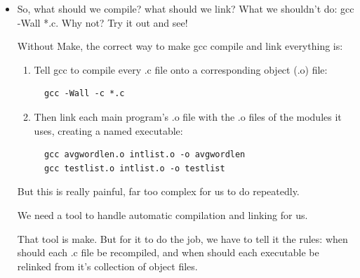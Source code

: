 \documentclass[handout]{beamer}
\begin{document}
\begin{frame}[fragile]
    \begin{itemize}
    \item
    So, what should we compile?  what should we link?
    \pitem
    What we shouldn't do: \alert{gcc -Wall *.c}.  Why not?  Try it out and see!

    \pitem
    Without Make, the correct way to make gcc compile and link everything is:

    \begin{enumerate}
    \pause
    \item
    Tell gcc to compile every .c file onto a corresponding object (.o) file:
\begin{verbatim}
  gcc -Wall -c *.c
\end{verbatim}

    \pause
    \item
    Then link each main program's .o file with the .o files of the modules it uses, creating a named executable:

\begin{verbatim}
  gcc avgwordlen.o intlist.o -o avgwordlen
  gcc testlist.o intlist.o -o testlist
\end{verbatim}

    \end{enumerate}

    \pitem
    But this is really painful, far too complex for us to do repeatedly.

    \pitem
    We \alert{need a tool to handle automatic compilation and linking for us}.

    \pitem
    That tool is \alert{make}.
    \pause
    But for it to do the job, we have to \alert{tell it the rules}:
    when should each .c file be recompiled, and when should each executable be relinked from it's
    collection of object files.

    \end{itemize}

\end{frame}
\end{document}
